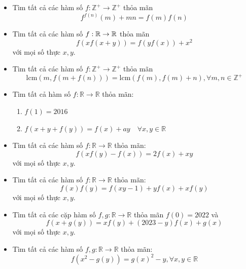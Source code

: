 \documentclass[11pt]{scrartcl}
\begin{document}
\begin{itemize}[label=, leftmargin=0em, itemsep=0.5em]
    \item \begin{btvn}
        Tìm tất cả các hàm số $f: \mathbb{Z}^+\rightarrow \mathbb{Z}^+$ thỏa mãn
        \[f^{f(n)}(m)+mn=f(m)f(n)\]
    \end{btvn}
    \item \begin{btvn}
        Tìm tất cả các hàm số $f: \mathbb{R} \to \mathbb{R}$ thỏa mãn 
        \[
            f(xf(x + y)) = f(yf(x)) + x^2
        \]
        với mọi số thực $x,y$.
    \end{btvn}
    \item \begin{btvn}
        Tìm tất cả các hàm số $f: \mathbb{Z}^+\rightarrow \mathbb{Z}^+$ thỏa mãn
        \[\text{lcm}(m, f(m+f(n)))=\text{lcm}(f(m), f(m)+n), \forall m,n \in \mathbb{Z}^+\]
    \end{btvn}


    \item \begin{btvn} Tìm tất cả hàm số $f:\mathbb{R} \to \mathbb{R}$ thỏa mãn:
        \begin{enumerate}
            \item $f(1) = 2016$
            \item $f(x+y+f(y))=f(x)+ay\quad\forall x,y\in\mathbb{R}$
        \end{enumerate}      
    \end{btvn}
    \item \begin{btvn} Tìm tất cả các hàm số $f:\mathbb{R} \to \mathbb{R}$ thỏa mãn:
        $$f(xf(y)-f(x))=2f(x)+xy$$
    với mọi số thực $x,y$.
    \end{btvn}
    \item \begin{btvn} Tìm tất cả các hàm số $f:\mathbb{R} \to \mathbb{R}$ thỏa mãn:
        \[f(x)f(y)=f(xy-1)+yf(x)+xf(y)\]
    với mọi số thực $x,y$.
    \end{btvn}
    \item \begin{btvn} Tìm tất cả các cặp hàm số $f,g:\mathbb{R} \to \mathbb{R}$ thỏa mãn $f(0) = 2022$ và
        \[f (x+g(y)) =xf(y)+(2023-y)f(x)+g(x)\]
    với mọi số thực $x,y$.
    \end{btvn}

    \item \begin{btvn}
    Tìm tất cả các hàm số $f,g: \mathbb{R} \to \mathbb{R}$ thỏa mãn:
    $$f(x^2-g(y))=g(x)^2-y, \forall x,y \in \mathbb{R}$$
    \end{btvn}


\end{itemize}
\end{document}
